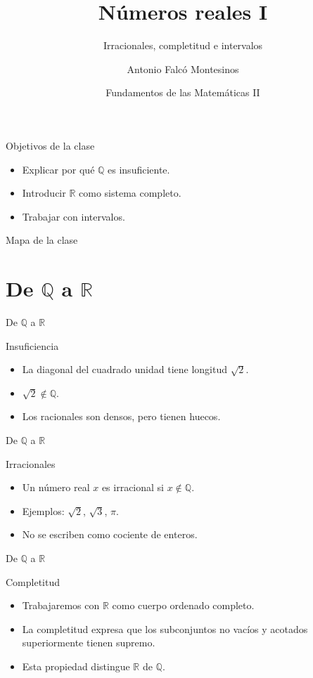 \documentclass[aspectratio=169,11pt]{beamer}
\title[FdM II -- Clase 13]{Números reales I}
\subtitle{Irracionales, completitud e intervalos}
\author{Antonio Falcó Montesinos}
\institute{Universidad CEU Cardenal Herrera}
\date{Fundamentos de las Matemáticas II}
\begin{document}
\begin{frame}
  \titlepage
\end{frame}

\begin{frame}{Objetivos de la clase}
\begin{itemize}
  \item Explicar por qué \(\mathbb{Q}\) es insuficiente.
  \item Introducir \(\mathbb{R}\) como sistema completo.
  \item Trabajar con intervalos.
\end{itemize}
\end{frame}

\begin{frame}{Mapa de la clase}
\tableofcontents
\end{frame}

\section{De \(\mathbb{Q}\) a \(\mathbb{R}\)}

\begin{frame}{De \(\mathbb{Q}\) a \(\mathbb{R}\)}
\begin{block}{Insuficiencia}
\begin{itemize}
  \item La diagonal del cuadrado unidad tiene longitud \(\sqrt{2}\).
  \item \(\sqrt{2}\notin\mathbb{Q}\).
  \item Los racionales son densos, pero tienen huecos.
\end{itemize}
\end{block}
\end{frame}

\begin{frame}{De \(\mathbb{Q}\) a \(\mathbb{R}\)}
\begin{block}{Irracionales}
\begin{itemize}
  \item Un número real \(x\) es irracional si \(x\notin\mathbb{Q}\).
  \item Ejemplos: \(\sqrt{2}\), \(\sqrt{3}\), \(\pi\).
  \item No se escriben como cociente de enteros.
\end{itemize}
\end{block}
\end{frame}

\begin{frame}{De \(\mathbb{Q}\) a \(\mathbb{R}\)}
\begin{block}{Completitud}
\begin{itemize}
  \item Trabajaremos con \(\mathbb{R}\) como cuerpo ordenado completo.
  \item La completitud expresa que los subconjuntos no vacíos y acotados superiormente tienen supremo.
  \item Esta propiedad distingue \(\mathbb{R}\) de \(\mathbb{Q}\).
\end{itemize}
\end{block}
\end{frame}
\end{document}
